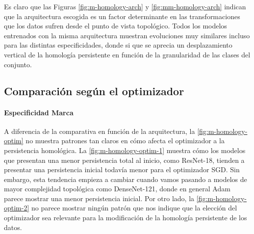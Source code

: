 Es claro que las Figuras \ref{fig:m-homology-arch} y \ref{fig:mm-homology-arch} indican
que la arquitectura escogida es un factor determinante en las transformaciones que
los datos sufren desde el punto de vista topológico. Todos los modelos
entrenados con la misma arquitectura muestran evoluciones muy similares incluso
para las distintas especificidades, donde si que se aprecia un desplazamiento vertical
de la homología persistente en función de la granularidad de las clases del conjunto.

\subsection{Comparación según el optimizador}
\label{subsec:optim}

\paragraph{Especificidad Marca}

A diferencia de la comparativa en función de la arquitectura, la \autoref{fig:m-homology-optim}
no muestra patrones tan claros en cómo afecta el optimizador a la persistencia homológica.
La \autoref{fig:m-homology-optim-1} muestra cómo los modelos que presentan una
menor persistencia total al inicio, como ResNet-18, tienden a presentar una
persistencia inicial todavía menor para el optimizador SGD. Sin embargo, esta
tendencia empieza a cambiar cuando vamos pasando a modelos de mayor complejidad
topológica como DenseNet-121, donde en general Adam parece mostrar una menor persistencia
inicial. Por otro lado, la \autoref{fig:m-homology-optim-2} no parece mostrar ningún
patrón que nos indique que la elección del optimizador sea relevante para la modificación
de la homología persistente de los datos.

